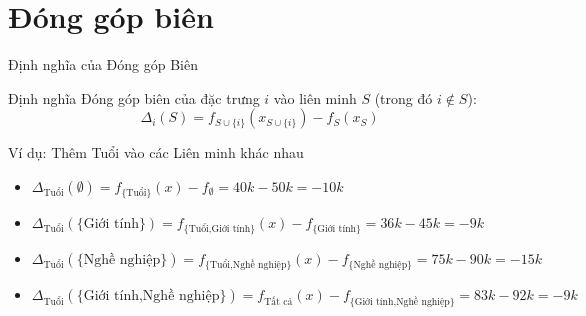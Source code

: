 \documentclass[notheorems, aspectratio=149]{beamer}
\begin{document}
\section{Đóng góp biên}

\begin{frame}{Định nghĩa của Đóng góp Biên}
\begin{block}{Định nghĩa}
Đóng góp biên của đặc trưng $i$ vào liên minh $S$ (trong đó $i \notin S$):
\begin{equation}
\Delta_i(S) = f_{S \cup \{i\}}(x_{S \cup \{i\}}) - f_S(x_S)
\end{equation}
\end{block}

\begin{exampleblock}{Ví dụ: Thêm Tuổi vào các Liên minh khác nhau}
\begin{itemize}
    \item $\Delta_{\text{Tuổi}}(\emptyset) = f_{\{\text{Tuổi}\}}(x) - f_\emptyset = 40k - 50k = -10k$
    \item $\Delta_{\text{Tuổi}}(\{\text{Giới tính}\}) = f_{\{\text{Tuổi,Giới tính}\}}(x) - f_{\{\text{Giới tính}\}} = 36k - 45k = -9k$
    \item $\Delta_{\text{Tuổi}}(\{\text{Nghề nghiệp}\}) = f_{\{\text{Tuổi,Nghề nghiệp}\}}(x) - f_{\{\text{Nghề nghiệp}\}} = 75k - 90k = -15k$
    \item $\Delta_{\text{Tuổi}}(\{\text{Giới tính,Nghề nghiệp}\}) = f_{\text{Tất cả}}(x) - f_{\{\text{Giới tính,Nghề nghiệp}\}} = 83k - 92k = -9k$
\end{itemize}
\end{exampleblock}
\end{frame}
\end{document}
